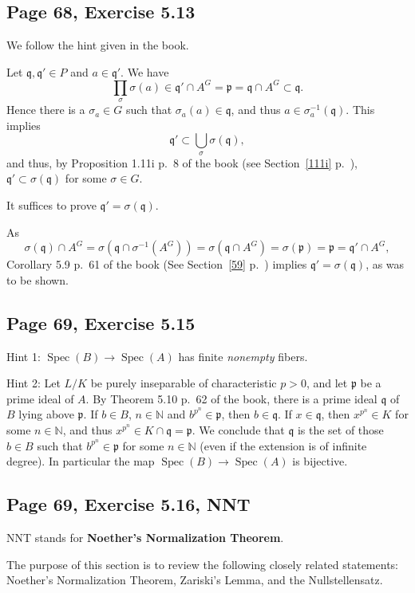 \documentclass[parskip=half,fontsize=12pt]{scrartcl}%
\newcommand{\mf}{\mathfrak}
\newcommand{\ppp}{\mf p}
\newcommand{\qqq}{\mf q}
\newcommand{\Spec}{\operatorname{Spec}}\newcommand{\Sp}{\operatorname{Spec}}
\begin{document}
\subsection{Page 68, Exercise 5.13}%

We follow the hint given in the book.

Let $\qqq,\qqq'\in P$ and $a\in\qqq'$. We have  
$$
\prod_\sigma\sigma(a)\in\qqq'\cap A^G=\ppp=\qqq\cap A^G\subset\qqq.
$$ 
Hence there is a $\sigma_a\in G$ such that $\sigma_a(a)\in\qqq$, and thus $a\in\sigma_a^{-1}(\qqq)$. This implies 
$$
\qqq'\subset\bigcup_\sigma\sigma(\qqq),
$$ 
and thus, by Proposition 1.11i p.~8 of the book (see Section~\ref{111i} p.~\pageref{111i}), $\qqq'\subset\sigma(\qqq)$ for some $\sigma\in G$. 

It suffices to prove $\qqq'=\sigma(\qqq)$.

As 
$$
\sigma(\qqq)\cap A^G=\sigma\left(\qqq\cap\sigma^{-1}(A^G)\right)=\sigma\left(\qqq\cap A^G\right)=\sigma(\ppp)=\ppp=\qqq'\cap A^G,
$$ 
Corollary 5.9 p.~61 of the book (See Section~\ref{59} p.~\pageref{59}) implies $\qqq'=\sigma(\qqq)$, as was to be shown.

\subsection{Page 69, Exercise 5.15}%

Hint 1: $\Spec(B)\to\Spec(A)$ has finite \emph{nonempty} fibers.

Hint 2: Let $L/K$ be purely inseparable of characteristic $p>0$, and let $\ppp$ be a prime ideal of $A$. By Theorem 5.10 p.~62 of the book, there is a prime ideal $\qqq$ of $B$ lying above $\ppp$. If $b\in B$, $n\in\mathbb N$ and $b^{p^n}\in\ppp$, then $b\in\qqq$. If $x\in\qqq$, then $x^{p^n}\in K$ for some $n\in\mathbb N$, and thus $x^{p^n}\in K\cap\qqq=\ppp$. We conclude that $\qqq$ is the set of those $b\in B$ such that $b^{p^n}\in\ppp$ for some $n\in\mathbb N$ (even if the extension is of infinite degree). In particular the map $\Spec(B)\to\Spec(A)$ is bijective.

\subsection{Page 69, Exercise 5.16, NNT}\label{nnt}%

NNT stands for \textbf{Noether's Normalization Theorem}.

The purpose of this section is to review the following closely related statements: Noether's Normalization Theorem, Zariski's Lemma, %
and the Nullstellensatz.
\end{document}
